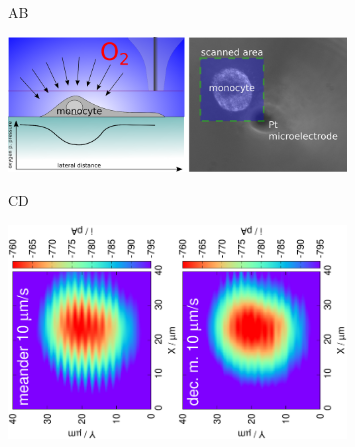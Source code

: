 \documentclass[a4paper, 11pt, oneside, bibliography=totoc]{article}
\begin{document}
\begin{figure}
\centering
\begin{flushleft}\hspace{2cm}A\hspace{6cm}B\end{flushleft}
\includegraphics[width=0.8\textwidth]{oxygen.eps}

\vspace{1cm}
\begin{flushleft}\hspace{2cm}C\hspace{7cm}D\end{flushleft}
\includegraphics[trim = 10mm 20mm 0mm 20mm, clip, width=0.4\textwidth, angle=-90]{9_41.eps}\includegraphics[trim = 10mm 20mm 0mm 20mm, clip, width=0.4\textwidth, angle=-90]{9_41_meandered_deconvoluted.eps}


\end{figure}
\end{document}
